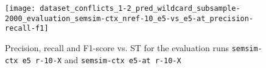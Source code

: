 \begin{figure}[H]
\centering
\texttt{[image: dataset\_conflicts\_1-2\_pred\_wildcard\_subsample-2000\_evaluation\_semsim-ctx\_nref-10\_e5-vs\_e5-at\_precision-recall-f1]}
\caption{Precision, recall and F1-score vs. ST for the evaluation runs \texttt{semsim-ctx e5 r-10-X} and \texttt{semsim-ctx e5-at r-10-X}}
\label{fig:prec-rec-f1-semsim-ctx-at}
\end{figure}



%
